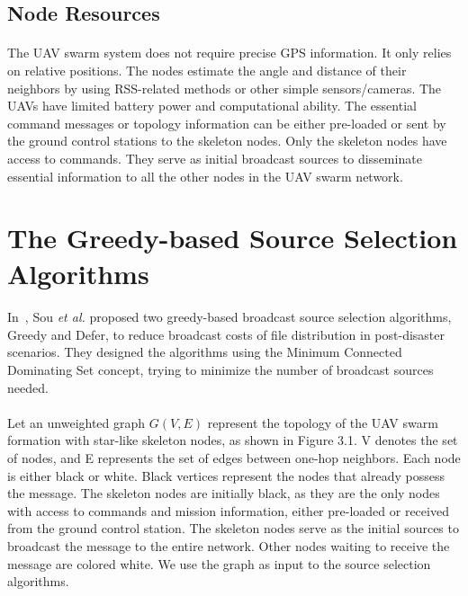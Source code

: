 \documentclass[a4paper,12pt]{report}
\begin{document}
\subsection{Node Resources}
\paragraph{}
The UAV swarm system does not require precise GPS information. It only relies on relative positions. The nodes estimate the angle and distance of their neighbors by using RSS-related methods or other simple sensors/cameras. The UAVs have limited battery power and computational ability. The essential command messages or topology information can be either pre-loaded or sent by the ground control stations to the skeleton nodes. Only the skeleton nodes have access to commands. They serve as initial broadcast sources to disseminate essential information to all the other nodes in the UAV swarm network.




\section{The Greedy-based Source Selection Algorithms}

\paragraph{}
In~\cite{prose}, Sou {\it et al.} proposed two greedy-based broadcast source selection algorithms, Greedy and Defer, to reduce broadcast costs of file distribution in post-disaster scenarios. They designed the algorithms using the Minimum Connected Dominating Set concept, trying to minimize the number of broadcast sources needed. 

\paragraph{}
Let an unweighted graph $G(V, E)$ represent the topology of the UAV swarm formation with star-like skeleton nodes, as shown in Figure 3.1. V denotes the set of nodes, and E represents the set of edges between one-hop neighbors. Each node is either black or white. Black vertices represent the nodes that already possess the message. The skeleton nodes are initially black, as they are the only nodes with access to commands and mission information, either pre-loaded or received from the ground control station. The skeleton nodes serve as the initial sources to broadcast the message to the entire network. Other nodes waiting to receive the message are colored white. We use the graph as input to the source selection algorithms. 
\end{document}

